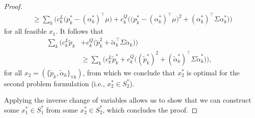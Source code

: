 \documentclass{article}
\begin{document}
\begin{proof}
\begin{align*}
&\ge \sum_k \Big(c_k^L\big(p_k^* - (\alpha_k^*)^\top \mu\big) + c_k^Q \Big(\big(p_k^* - (\alpha_{k}^*)^\top \mu \big)^2 + (\alpha_k^*)^\top \Sigma \alpha_k^*\Big)\Big)
\end{align*}
for all feasible $x_1$. It follows that 
\begin{align*}
\sum_k \Big(c_k^L \tilde{p}_k & + c_k^Q \Big(\tilde{p}_k^2 + \tilde{\alpha}_k^\top \Sigma \tilde{\alpha}_k\Big)\Big)\\
&\ge \sum_k \Big(c_k^L \tilde{p}_k^* + c_k^Q \Big((\tilde{p}_k^*)^2 + (\tilde{\alpha}_k^*)^\top \Sigma \tilde{\alpha}_k^*\Big)\Big),
\end{align*}
for all $x_2 = (\{\tilde{p}_k, \tilde{\alpha}_k\}_{\forall k})$, from which we conclude that $x_2^*$ is optimal for the second problem formulation (i.e., $x_2^* \in S_2^*$). 

Applying the inverse change of variables allows us to show that we can construct some $x_1^* \in S_1^*$ from some $x_2^* \in S_2^*$, which concludes the proof.
\end{proof}


\end{document}

